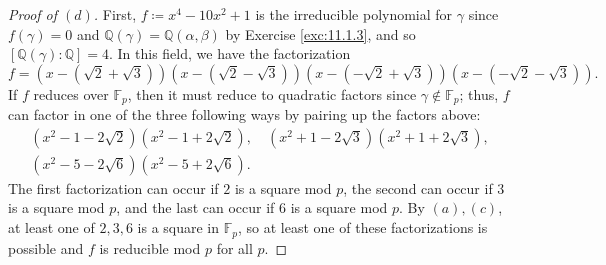 \documentclass[12pt]{article}
\theoremstyle{remark}
\begin{document}
\begin{proof}[Proof of $(d)$]
  First, $f \coloneqq x^4 - 10x^2 + 1$ is the irreducible polynomial for $\gamma$ since $f(\gamma) = 0$ and $\mathbb{Q}(\gamma) = \mathbb{Q}(\alpha,\beta)$ by Exercise \ref{exc:11.1.3}, and so $[\mathbb{Q}(\gamma):\mathbb{Q}] = 4$. In this field, we have the factorization
  \begin{equation*}
    f = (x-(\sqrt{2}+\sqrt{3}))(x-(\sqrt{2}-\sqrt{3}))(x-(-\sqrt{2}+\sqrt{3}))(x-(-\sqrt{2}-\sqrt{3})).
  \end{equation*}
  If $f$ reduces over $\mathbb{F}_p$, then it must reduce to quadratic factors since $\gamma \notin \mathbb{F}_p$; thus, $f$ can factor in one of the three following ways by pairing up the factors above:
  \begin{gather*}
    (x^2 - 1 - 2\sqrt{2})(x^2 - 1 + 2\sqrt{2}), \quad (x^2 + 1 - 2\sqrt{3})(x^2 + 1 + 2\sqrt{3}),\\
    (x^2 - 5 - 2\sqrt{6})(x^2 - 5 + 2\sqrt{6}).
  \end{gather*}
  The first factorization can occur if $2$ is a square mod $p$, the second can occur if $3$ is a square mod $p$, and the last can occur if $6$ is a square mod $p$. By $(a),(c)$, at least one of $2,3,6$ is a square in $\mathbb{F}_p$, so at least one of these factorizations is possible and $f$ is reducible mod $p$ for all $p$.
\end{proof}
\end{document}
